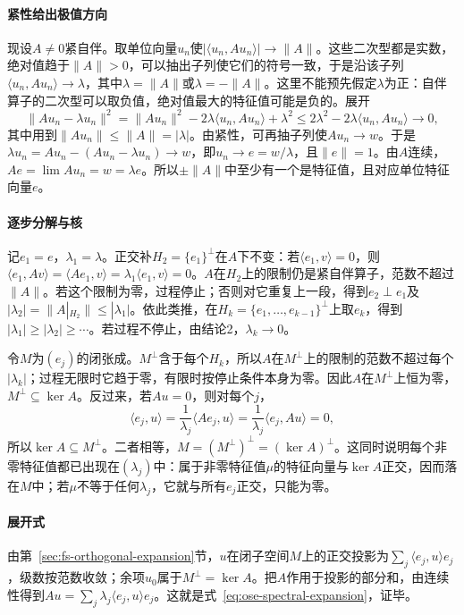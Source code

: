 \paragraph{紧性给出极值方向}
现设$A\neq0$紧自伴。取单位向量$u_n$使$|\langle u_n,Au_n\rangle|\to\|A\|$。这些二次型都是实数，绝对值趋于$\|A\|>0$，可以抽出子列使它们的符号一致，于是沿该子列$\langle u_n,Au_n\rangle\to\lambda$，其中$\lambda=\|A\|$或$\lambda=-\|A\|$。这里不能预先假定$\lambda$为正：自伴算子的二次型可以取负值，绝对值最大的特征值可能是负的。展开
\[
  \|Au_n-\lambda u_n\|^2=\|Au_n\|^2-2\lambda\langle u_n,Au_n\rangle+\lambda^2\leq2\lambda^2-2\lambda\langle u_n,Au_n\rangle\to0 ,
\]
其中用到$\|Au_n\|\leq\|A\|=|\lambda|$。由紧性，可再抽子列使$Au_n\to w$。于是$\lambda u_n=Au_n-(Au_n-\lambda u_n)\to w$，即$u_n\to e=w/\lambda$，且$\|e\|=1$。由$A$连续，$Ae=\lim Au_n=w=\lambda e$。所以$\pm\|A\|$中至少有一个是特征值，且对应单位特征向量$e$。

\paragraph{逐步分解与核}
记$e_1=e$，$\lambda_1=\lambda$。正交补$H_2=\{e_1\}^\perp$在$A$下不变：若$\langle e_1,v\rangle=0$，则$\langle e_1,Av\rangle=\langle Ae_1,v\rangle=\lambda_1\langle e_1,v\rangle=0$。$A$在$H_2$上的限制仍是紧自伴算子，范数不超过$\|A\|$。若这个限制为零，过程停止；否则对它重复上一段，得到$e_2\perp e_1$及$|\lambda_2|=\|A|_{H_2}\|\leq|\lambda_1|$。依此类推，在$H_k=\{e_1,\ldots,e_{k-1}\}^\perp$上取$e_k$，得到$|\lambda_1|\geq|\lambda_2|\geq\cdots$。若过程不停止，由结论2，$\lambda_k\to0$。

令$M$为$(e_j)$的闭张成。$M^\perp$含于每个$H_k$，所以$A$在$M^\perp$上的限制的范数不超过每个$|\lambda_k|$；过程无限时它趋于零，有限时按停止条件本身为零。因此$A$在$M^\perp$上恒为零，$M^\perp\subseteq\ker A$。反过来，若$Au=0$，则对每个$j$，
\[
  \langle e_j,u\rangle=\frac{1}{\lambda_j}\langle Ae_j,u\rangle=\frac{1}{\lambda_j}\langle e_j,Au\rangle=0 ,
\]
所以$\ker A\subseteq M^\perp$。二者相等，$M=(M^\perp)^\perp=(\ker A)^\perp$。这同时说明每个非零特征值都已出现在$(\lambda_j)$中：属于非零特征值$\mu$的特征向量与$\ker A$正交，因而落在$M$中；若$\mu$不等于任何$\lambda_j$，它就与所有$e_j$正交，只能为零。

\paragraph{展开式}
由第~\ref{sec:fs-orthogonal-expansion}节，$u$在闭子空间$M$上的正交投影为$\sum_j\langle e_j,u\rangle e_j$，级数按范数收敛；余项$u_0$属于$M^\perp=\ker A$。把$A$作用于投影的部分和，由连续性得到$Au=\sum_j\lambda_j\langle e_j,u\rangle e_j$。这就是式~\eqref{eq:ose-spectral-expansion}，证毕。

